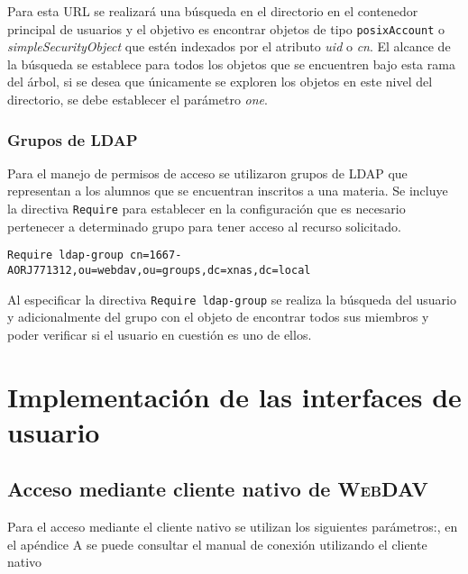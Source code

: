 Para esta URL se realizar\'{a} una b\'{u}squeda en el directorio en el contenedor principal de usuarios y el objetivo es encontrar objetos de tipo \texttt{posixAccount} o \textsl{simpleSecurityObject} que est\'{e}n indexados por el atributo \textsl{uid} o \textsl{cn}. El alcance de la b\'{u}squeda se establece para todos los objetos que se encuentren bajo esta rama del \'{a}rbol, si se desea que \'{u}nicamente se exploren los objetos en este nivel del directorio, se debe establecer el par\'{a}metro \textsl{one}.

        \subsubsection {Grupos de \textsc{LDAP}}

Para el manejo de permisos de acceso se utilizaron grupos de \textsc{LDAP} que representan a los alumnos que se encuentran inscritos a una materia. Se incluye la directiva \texttt{Require} para establecer en la configuraci\'{o}n que es necesario pertenecer a determinado grupo para tener acceso al recurso solicitado.

{
\scriptsize
\linespread{1}
\begin{verbatim}
Require ldap-group cn=1667-AORJ771312,ou=webdav,ou=groups,dc=xnas,dc=local
\end{verbatim}
}

Al especificar la directiva \texttt{Require ldap-group} se realiza la b\'{u}squeda del usuario y adicionalmente del grupo con el objeto de encontrar todos sus miembros y poder verificar si el usuario en cuesti\'{o}n es uno de ellos.


    \section {Implementaci\'{o}n de las interfaces de usuario}

      \subsection {Acceso mediante cliente nativo de \textsc{WebDAV}}

Para el acceso mediante el cliente nativo se utilizan los siguientes par\'{a}metros:, en el ap\'{e}ndice A se puede consultar el manual de conexi\'{o}n utilizando el cliente nativo

{
\begin{table}[H]
\caption{Par\'{a}metros de conexi\'{o}n \texttt{WebDAV}}{}
\label{tab:webdav-parameters}
\noindent{} %
\end{table}
}

